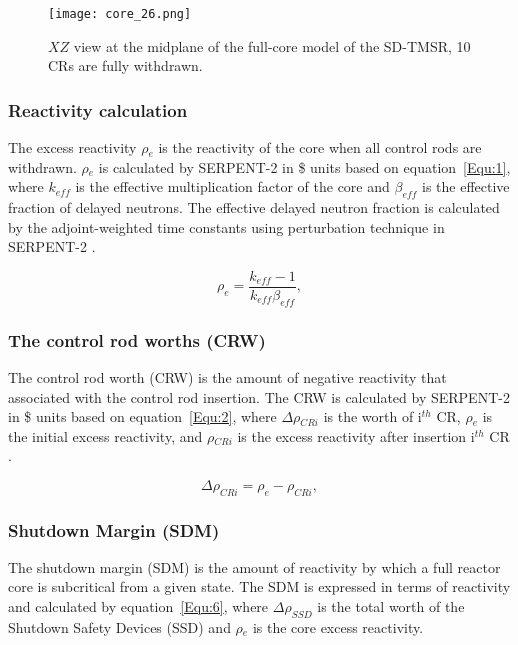 \begin{figure}[t!] %
	\centering
	\texttt{[image: core\_26.png]}
	\caption{$XZ$ view at the midplane of the full-core model of the SD-TMSR, 10 CRs are fully withdrawn.}
	\label{fig:core_26}
\end{figure}

\subsubsection{Reactivity calculation}

The excess reactivity $\rho$$_e$ is the reactivity of the core when all control rods are withdrawn. $\rho$$_e$ is calculated by SERPENT-2 in \$ units based on equation~\ref{Equ:1}, where $k_{eff}$ is the effective multiplication factor of the core and $\beta_{eff}$ is the effective fraction of delayed neutrons. The effective delayed neutron fraction is calculated by the adjoint-weighted time constants using perturbation technique in SERPENT-2 \cite{leppanen2014calculation}.

\begin{equation}
\label{Equ:1}
{{\rho}_{e}}=\dfrac{{k_{eff}}-1}{{k_{eff}}{{\beta}_{eff}}},
\end{equation}

\subsubsection{The control rod worths (CRW)}

The control rod worth (CRW) is the amount of negative reactivity that associated with the control rod insertion. The CRW is calculated by SERPENT-2 in \$ units based on equation~\ref{Equ:2}, where $\Delta\rho$$_{CRi}$ is the worth of i$^{th}$ CR, $\rho$$_e$ is the initial excess reactivity, and $\rho$$_{CRi}$ is the excess reactivity after insertion i$^{th}$ CR \cite{vcerba2017optimization}.

\begin{equation}
\label{Equ:2}
{{\Delta}{\rho}_{CRi}}={{\rho}_{e}}-{{\rho}_{CRi}},
\end{equation}

\subsubsection{Shutdown Margin (SDM)}

The shutdown margin (SDM) is the amount of reactivity by which a full reactor core is subcritical from a given state. The SDM is expressed in terms of reactivity and calculated by equation~\ref{Equ:6}, where $\Delta\rho_{SSD}$ is the total worth of the Shutdown Safety Devices (SSD) and $\rho$$_e$ is the core excess reactivity.

